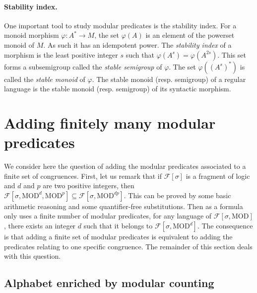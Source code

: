 \documentclass[submission,hidelink]{dmtcs-episciences}
\newcommand{\cF}{\mathcal{F}}
\newcommand{\MOD}{\mathrm{MOD}}
\begin{document}
\paragraph{Stability index.}
One important tool to study modular predicates is the stability index.
For a monoid morphism $\varphi : A^* \to M$, the set $\varphi(A)$ is an element of the powerset
monoid of $M$.
As such it has an idempotent power. The \emph{stability index} of a morphism
is the 	least positive integer $s$
such that $\varphi(A^s)=\varphi(A^{2s})$. This set forms a subsemigroup called
the \emph{stable semigroup} of
$\varphi$.
The set $\varphi((A^s)^*)$ is called the \emph{stable monoid}
of $\varphi$.
The stable monoid (resp. semigroup) of a regular language is the stable monoid (resp. semigroup) of its syntactic morphism.



\section{Adding finitely many modular predicates}\label{Section:Finite}

We consider here the question of adding the modular predicates associated to a finite set of congruences.
First, let us remark that if
$\cF[\sigma]$ is a fragment of logic and $d$ and $p$ are two positive integers,
then $\cF[\sigma,\MOD^d,\MOD^p]\subseteq\cF[\sigma,\MOD^{dp}]$. This can be proved by some basic arithmetic reasoning and some quantifier-free substitutions.
Then as a formula only uses a finite number of modular predicates, for any language of $\cF[\sigma,\MOD]$, there exists an integer $d$ such that it belongs to $\cF[\sigma,\MOD^d]$.
The consequence is that adding a finite set of modular predicates is equivalent to adding the predicates relating to one specific congruence.
The remainder of this section deals with this question.



\subsection{Alphabet enriched by modular counting}
\end{document}
